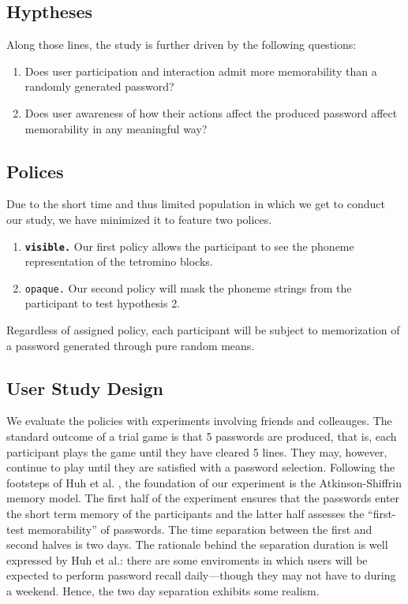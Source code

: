 \documentclass[conference]{IEEEtran}
\begin{document}
\subsection{Hyptheses}
Along those lines, the study is further driven by the following questions:
\begin{enumerate}
	\item Does user participation and interaction admit more memorability than a randomly generated password?
	\item Does user awareness of how their actions affect the produced password affect memorability in any meaningful way?
\end{enumerate}
\subsection{Polices}
Due to the short time and thus limited population in which we get to conduct our study, we have minimized it to feature two polices. 
\begin{enumerate}
	\item {\bf\tt visible.} Our first policy allows the participant to see the phoneme representation of the tetromino blocks. 
	\item {\tt opaque.} Our second policy will mask the phoneme strings from the participant to test hypothesis 2.
\end{enumerate}
Regardless of assigned policy, each participant will be subject to memorization of a password generated through pure random means.
\subsection{User Study Design}
We evaluate the policies with experiments involving friends and colleauges. The standard outcome of a trial game is that 5 passwords are produced, that is, each participant plays the game until they have cleared 5 lines. They may, however, continue to play until they are satisfied with a password selection. Following the footsteps of Huh et al. \cite{report:surpass}, the foundation of our experiment is the Atkinson-Shiffrin memory model. The first half of the experiment ensures that the passwords enter the short term memory of the participants and the latter half assesses the ``first-test memorability'' of passwords. The time separation between the first and second halves is two days. The rationale behind the separation duration is well expressed by Huh et al.: there are some enviroments in which users will be expected to perform password recall daily---though they may not have to during a weekend. Hence, the two day separation exhibits some realism.
\end{document}
